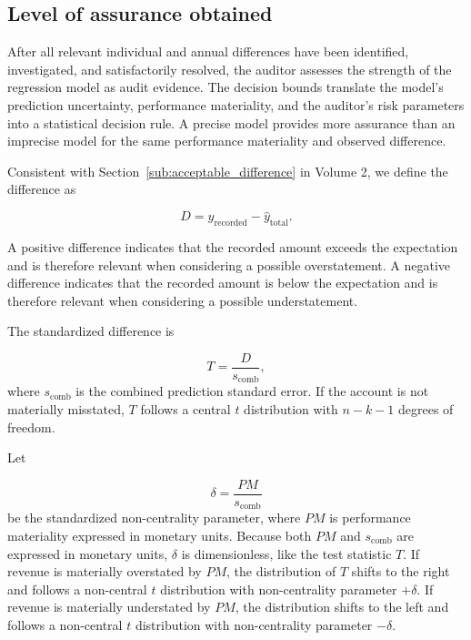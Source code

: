 
\subsection{Level of assurance obtained} %
\label{sub:level_of_assurance_obtained}

After all relevant individual and annual differences have been identified, investigated, and satisfactorily resolved, the auditor assesses the strength of the regression model as audit evidence. The decision bounds translate the model's prediction uncertainty, performance materiality, and the auditor's risk parameters into a statistical decision rule. A precise model provides more assurance than an imprecise model for the same performance materiality and observed difference.

Consistent with Section~\ref{sub:acceptable_difference} in Volume 2, we define the difference as

\begin{equation}
D = y_{\text{recorded}} - \hat{y}_{\text{total}}.
\end{equation}

A positive difference indicates that the recorded amount exceeds the expectation and is therefore relevant when considering a possible overstatement. A negative difference indicates that the recorded amount is below the expectation and is therefore relevant when considering a possible understatement.

The standardized difference is

\begin{equation}
T = \frac{D}{s_{\text{comb}}},
\end{equation}
where $s_{\text{comb}}$ is the combined prediction standard error. If the account is not materially misstated, $T$ follows a central $t$ distribution with $n - k - 1$ degrees of freedom.

Let

\begin{equation}
\delta = \frac{PM}{s_{\text{comb}}}
\end{equation}
be the standardized non-centrality parameter, where $PM$ is performance materiality expressed in monetary units. Because both $PM$ and $s_{\text{comb}}$ are expressed in monetary units, $\delta$ is dimensionless, like the test statistic $T$. If revenue is materially overstated by $PM$, the distribution of $T$ shifts to the right and follows a non-central $t$ distribution with non-centrality parameter $+\delta$. If revenue is materially understated by $PM$, the distribution shifts to the left and follows a non-central $t$ distribution with non-centrality parameter $-\delta$.

